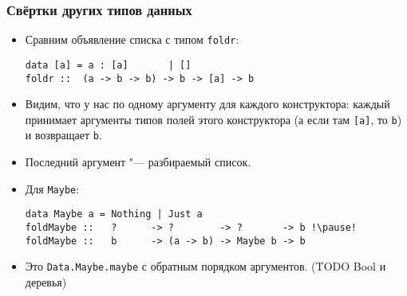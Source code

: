 \documentclass[11pt]{beamer}
\begin{document}
\begin{frame}[fragile]
\frametitle{Свёртки других типов данных}
\begin{itemize}
    \item Сравним объявление списка с типом \lstinline|foldr|:
\begin{lstlisting}
data [a] = a : [a]       | []
foldr ::  (a -> b -> b) -> b -> [a] -> b
\end{lstlisting}
    \item Видим, что у нас по одному аргументу для каждого конструктора: каждый принимает аргументы типов полей этого конструктора (а если там \lstinline|[a]|, то \lstinline|b|) и возвращает \lstinline|b|. 
    \item Последний аргумент "--- разбираемый список.
    \item Для \lstinline|Maybe|:
\begin{lstlisting}[basicstyle=\ttfamily\footnotesize]
data Maybe a = Nothing | Just a
foldMaybe ::   ?      -> ?        -> ?       -> b !\pause!
foldMaybe ::   b      -> (a -> b) -> Maybe b -> b
\end{lstlisting}
    \pause
    \item Это \lstinline|Data.Maybe.maybe| с обратным порядком аргументов. (TODO Bool и деревья)
\end{itemize}
\end{frame}
\end{document}
